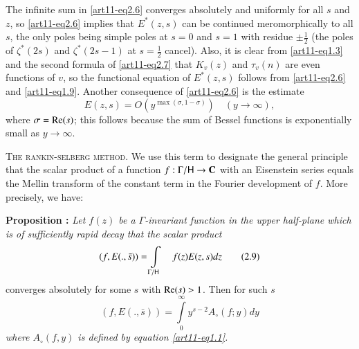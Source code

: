 The infinite sum in \eqref{art11-eq2.6} converges absolutely and uniformly for all $s$ and $z$, so \eqref{art11-eq2.6} implies that $E^\ast(z,s)$ can be continued meromorphically to all $s$, the only poles being simple poles at $s=0$ and $s =1$ with residue $\pm \frac{1}{2}$ (the poles of $\zeta^\ast (2s)$ and $\zeta^\ast (2s-1)$ at $s = \frac{1}{2}$ cancel). Also, it is clear from \eqref{art11-eq1.3} and the second formula of \eqref{art11-eq2.7} that $K_v (z)$ and $\tau_v (n)$ are even functions of $v$, so the functional equation of $E^\ast(z,s)$ follows from \eqref{art11-eq2.6} and \eqref{art11-eq1.9}. Another consequence of \eqref{art11-eq2.6} is the estimate 
\begin{equation*}
E(z,s) = O(y^{\max (\sigma, 1 -\sigma)})\quad (y \to \infty), \tag{2.8}\label{art11-eq2.8}
\end{equation*}
where $\sigma = \operatorname{Re}(s)$; this follows because the sum of Bessel functions is exponentially small as $y \to \infty$. 

\medskip
\noindent
\textsc{The rankin-selberg method.} We use this term to designate the general principle that the scalar product of a function $f: \Gamma / \mathsf{H} \to \mathbf{C}$ with an Eisenstein series equals the Mellin transform of the constant term in the Fourier development of $f$. More precisely, we have:

\medskip
\noindent
{\bfseries Proposition :\label{art11-prop1}}
\textit{Let $f(z)$ be a $\Gamma$-invariant function in the upper half-plane which is of sufficiently rapid decay that the scalar product}
\begin{equation*}
(f, E(.,\bar{s})) = \int\limits_{\Gamma / \mathsf{H}} \quad f(z) E (z,s) dz \tag{2.9}\label{art11-eq2.9}
\end{equation*}
converges absolutely for some $s$ with $\operatorname{Re} (s) >1$. Then for such $s$
\begin{equation*}
(f, E (.,\bar{s})) = \int\limits^\infty_{0} y^{s-2} A_\circ (f;y) dy \tag{2.10}\label{art11-eq2.10}
\end{equation*}
\textit{where $A_\circ (f,y)$ is defined by equation \eqref{art11-eq1.1}.}

